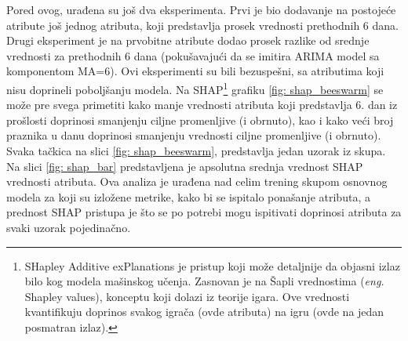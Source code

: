 \documentclass[12pt,oneside]{memoir}
\begin{document}
Pored ovog, urađena su još dva eksperimenta. Prvi je bio dodavanje na postojeće atribute još jednog atributa, koji predstavlja prosek vrednosti prethodnih 6 dana. Drugi eksperiment je na prvobitne atribute dodao prosek razlike od srednje vrednosti za prethodnih 6 dana (pokušavajući da se imitira ARIMA model sa komponentom MA=6). Ovi eksperimenti su bili bezuspešni, sa atributima koji nisu doprineli poboljšanju modela. Na SHAP\footnote{SHapley Additive exPlanations je pristup koji može detaljnije da objasni izlaz bilo kog modela mašinskog učenja. Zasnovan je na Šapli vrednostima (\textit{eng.} Shapley values), konceptu koji dolazi iz teorije igara. Ove vrednosti kvantifikuju doprinos svakog igrača (ovde atributa) na igru (ovde na jedan posmatran izlaz).} grafiku \ref{fig: shap_beeswarm} se može pre svega primetiti kako manje vrednosti atributa koji predstavlja 6. dan iz prošlosti doprinosi smanjenju ciljne promenljive (i obrnuto), kao i kako veći broj praznika u danu doprinosi smanjenju vrednosti ciljne promenljive (i obrnuto). Svaka tačkica na slici \ref{fig: shap_beeswarm}, predstavlja jedan uzorak iz skupa. Na slici \ref{fig: shap_bar} predstavljena je apsolutna srednja vrednost SHAP vrednosti atributa. Ova analiza je urađena nad celim trening skupom osnovnog modela za koji su izložene metrike, kako bi se ispitalo ponašanje atributa, a prednost SHAP pristupa je što se po potrebi mogu ispitivati doprinosi atributa za svaki uzorak pojedinačno.
\end{document}
